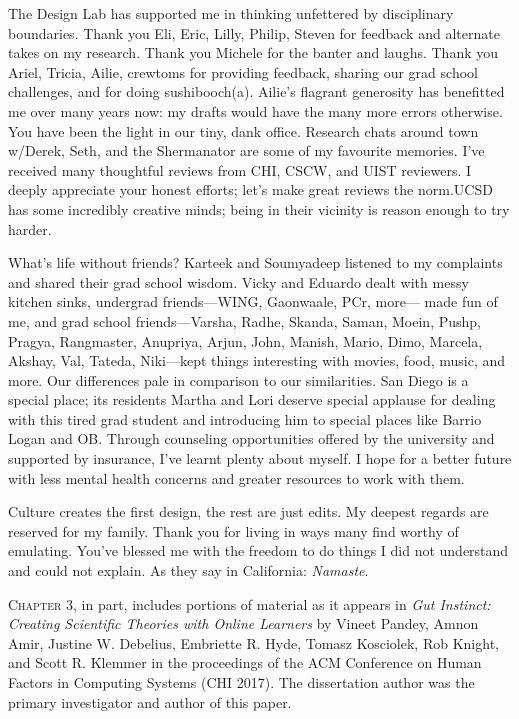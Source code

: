 \begin{frontmatter}
\begin{acknowledgements}
The Design Lab has supported me in thinking unfettered by disciplinary boundaries. Thank you Eli, Eric, Lilly, Philip, Steven for feedback and alternate takes on my research. Thank you Michele for the banter and laughs. Thank you Ariel, Tricia, Ailie, crewtoms for providing feedback, sharing our grad school challenges, and for doing sushibooch(a). Ailie's flagrant generosity has benefitted me over many years now: my drafts would have the many more errors otherwise. You have been the light in our tiny, dank office. Research chats around town w/Derek, Seth, and the Shermanator are some of my favourite memories. I’ve received many thoughtful reviews from CHI, CSCW, and UIST reviewers. I deeply appreciate your honest efforts; let’s make great reviews the norm.UCSD has some incredibly creative minds; being in their vicinity is reason enough to try harder. 

What’s life without friends? Karteek and Soumyadeep listened to my complaints and shared their grad school wisdom. Vicky and Eduardo dealt with messy kitchen sinks, undergrad friends---WING, Gaonwaale, PCr, more--- made fun of me, and grad school friends---Varsha, Radhe, Skanda, Saman, Moein, Pushp, Pragya, Rangmaster, Anupriya, Arjun, John, Manish, Mario, Dimo, Marcela, Akshay, Val, Tateda, Niki---kept things interesting with movies, food, music, and more. Our differences pale in comparison to our similarities. San Diego is a special place; its residents Martha and Lori deserve special applause for dealing with this tired grad student and introducing him to special places like Barrio Logan and OB. Through counseling opportunities offered by the university and supported by insurance, I’ve learnt plenty about myself. I hope for a better future with less mental health concerns and greater resources to work with them.

Culture creates the first design, the rest are just edits. My deepest regards are reserved for my family. Thank you for living in ways many find worthy of emulating. You've blessed me with the freedom to do things I did not understand and could not explain. As they say in California: \textit{Namaste}. 



\vspace{0.25in}

\textsc{Chapter 3}, in part, includes portions of material as it appears in \emph{Gut Instinct: Creating Scientific Theories with Online Learners} by Vineet Pandey, Amnon Amir, Justine W. Debelius, Embriette R. Hyde, Tomasz Kosciolek, Rob Knight, and Scott R. Klemmer in the proceedings of the ACM Conference on Human Factors in Computing Systems (CHI 2017). The dissertation author was the primary investigator and author of this paper.


\end{acknowledgements}
\end{frontmatter}
